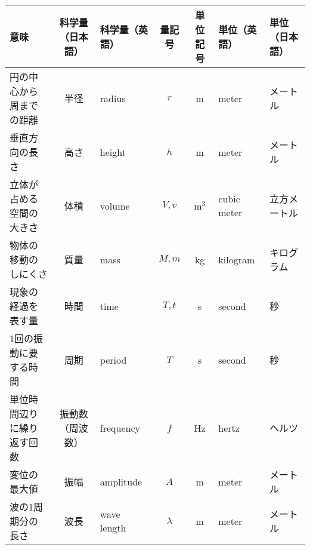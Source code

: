 \documentclass[b5j, landscape]{jarticle}
\begin{document}
\vfill
\begin{tabular}{|l|c|l|c|c|l|l|}\hline
\hfil 意味	&科学量（日本語）				&\hfil 科学量（英語）				&量記号				&単位記号		&\hfil 単位（英語）					&\hfil 単位（日本語）\\ \hline
円の中心から周までの距離	&半径				&radius					&$r$				&m		&meter						&メートル \\ \hline
垂直方向の長さ	&高さ				&height					&$h$				&m		&meter						&メートル \\ \hline
立体が占める空間の大きさ	&体積				&volume					&$V, v$				&m$^3$	&cubic meter				&立方メートル \\ \hline
物体の移動のしにくさ	&質量				&mass					&$M, m$				&kg		&kilogram					&キログラム \\ \hline
現象の経過を表す量	&時間				&time					&$T, t$				&s		&second						&秒 \\ \hline
1回の振動に要する時間	&周期				&period			&$T$				&s		&second						&秒 \\ \hline
単位時間辺りに繰り返す回数	&振動数（周波数）	&frequency			&$f$				&Hz		&hertz						&ヘルツ \\ \hline
変位の最大値	&振幅				&amplitude		&$A$				&m		&meter						&メートル \\ \hline
波の1周期分の長さ	&波長				&wave length		&$\lambda$			&m		&meter						&メートル \\ \hline
\end{tabular}
\end{document}
